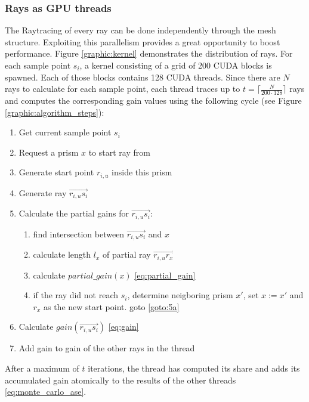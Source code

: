\subsubsection{Rays as GPU threads}
    The Raytracing of every ray can be done independently through the mesh
    structure.  Exploiting this parallelism provides a great opportunity to
    boost performance. Figure \ref{graphic:kernel} demonstrates the distribution
    of rays. For each sample point $s_i$, a kernel consisting of a grid of 200
    CUDA blocks is spawned. Each of those blocks contains 128 CUDA threads.
    Since there are $N$ rays to calculate for each sample point, each thread
    traces up to $t = \lceil\frac {N}{200\cdot128}\rceil$ rays and computes the
    corresponding gain values using the following cycle (see Figure
    \ref{graphic:algorithm_steps}):
    
    \begin{enumerate}
      \item Get current sample point $s_i$
      \item Request a prism $x$ to start ray from
      \item Generate start point $r_{i,u}$ inside this prism 
      \item Generate ray $\overrightarrow{r_{i,u}s_i}$
      \item Calculate the partial gains for $\overrightarrow{r_{i,u}s_i}$:
        \begin{enumerate}
          \item find intersection between $\overrightarrow{r_{i,u}s_i}$
            and $x$\label{goto:5a}
          \item calculate length $l_x$ of partial ray $\overrightarrow{r_{i,u}r_x}$
          \item calculate $partial\_gain(x)$ \eqref{eq:partial_gain}
          \item if the ray did not reach $s_i$, determine neigboring prism $x'$,
            set $x := x'$ and $r_x$ as the new start point. goto \ref{goto:5a} 
        \end{enumerate}
      \item Calculate $gain(\overrightarrow{r_{i,u}s_i})$ \eqref{eq:gain}
      \item Add gain to gain of the other rays in the thread
    \end{enumerate}
    After a maximum of $t$ iterations, the thread has computed its share and
    adds its accumulated gain atomically to the results of the other threads
    \eqref{eq:monte_carlo_ase}.

